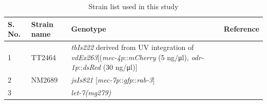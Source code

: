 \begin{appendices}
	\begin{table}[H]\centering
		\caption{Strain list used in this study}\label{tab:StrainlistA}
		\scriptsize
		\begin{tabularx}{1\textwidth}{@{} l l L l @{}}\toprule
			S. No. &Strain name &Genotype &Reference \\ &TT2464 &\textit{tbIs222} derived from UV integration of \textit{vdEx263}[(\textit{mec-4p}::\textit{mCherry} (5 ng/μl), \textit{odr-1p}::\textit{dsRed} (30 ng/μl)] &\cite{kirszenblat2013} \\
			2 &NM2689 &\textit{jsIs821} [\textit{mec-7p}::\textit{gfp}::\textit{rab-3}] &\cite{bounoutas2009} \\
			3 & &\textit{let-7(mg279)} &\cite{reinhart2000} \\
			\bottomrule
		\end{tabularx}
	\end{table}
	

\end{appendices}

